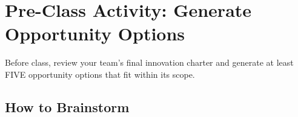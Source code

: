 \section{Pre-Class Activity: Generate Opportunity Options}

Before class, review your team's final innovation charter and generate at least FIVE opportunity options that fit within its scope.

\subsection{How to Brainstorm}


